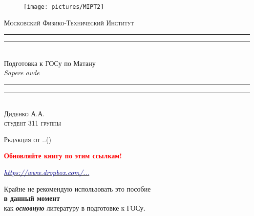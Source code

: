 \thispagestyle{empty}
\begingroup
{}
\centering
\settowidth{\unitlength}{\LARGE\scshape Московский Физико-Технический Институт}

\begin{figure}[!h]
\center
\texttt{[image: pictures/MIPT2]}
\end{figure}
\vspace*{\baselineskip}
{\LARGE\scshape Московский Физико-Технический Институт}\\[\baselineskip]
\rule{\unitlength}{1.6pt}\vspace*{-\baselineskip}\vspace*{2pt}
\rule{\unitlength}{0.4pt}\\[1.8\baselineskip]
{\Huge Подготовка к ГОСу по Матану}\\[\baselineskip]
{\large \itshape Sapere aude}\\[0.7\baselineskip]
\rule{\unitlength}{0.4pt}\vspace*{-\baselineskip}\vspace{3.2pt}
\rule{\unitlength}{1.6pt}\\[\baselineskip]
{\Large\scshape Диденко А.А. \\ $ $\\студент 311 группы}\par
\vspace*{2\baselineskip}  




{\LARGE\scshape Редакция от \twodigit\day.\twodigit\month.\the\year \;(\currenttime)}\par %

\mbox{}

\textcolor{red}{\huge \textbf{Обновляйте книгу по этим ссылкам!}}


\mbox{}

\href{https://www.dropbox.com/sh/7e5mfj8q68o2ipp/AAD8XvpZhiJzFbEh_IeH305ia?dl=0&preview=GOSBook.pdf}{\large \textcolor{darkblue}{\textit{https://www.dropbox.com/...}}}

\mbox{}

Крайне не рекомендую использовать это пособие\\ {\textbf{в данный момент}} \\как \textit{\textbf{основную}} литературу в подготовке к ГОСу. \\

